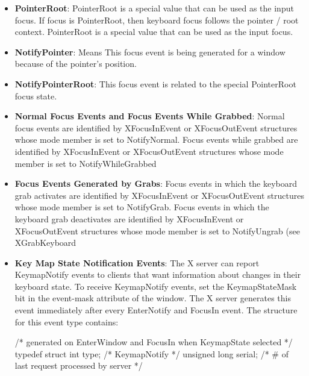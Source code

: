 \documentclass{report}
\begin{document}
\begin{itemize}
            \bigbreak \noindent 
            Depending on the event mode, the detail member is set to indicate the notify detail and can be NotifyAncestor, NotifyVirtual, NotifyInferior, NotifyNonlinear, NotifyNonlinearVirtual, NotifyPointer, NotifyPointerRoot, or NotifyDetailNone.
        \item \textbf{PointerRoot}: PointerRoot is a special value that can be used as the input focus.
            \bigbreak \noindent 
            If focus is PointerRoot, then keyboard focus follows the pointer / root context. PointerRoot is a special value that can be used as the input focus.
        \item \textbf{NotifyPointer}: Means This focus event is being generated for a window because of the pointer’s position.
        \item \textbf{NotifyPointerRoot}: This focus event is related to the special PointerRoot focus state.
        \item \textbf{Normal Focus Events and Focus Events While Grabbed}: Normal focus events are identified by XFocusInEvent or XFocusOutEvent structures whose mode member is set to NotifyNormal. Focus events while grabbed are identified by XFocusInEvent or XFocusOutEvent structures whose mode member is set to NotifyWhileGrabbed
        \item \textbf{Focus Events Generated by Grabs}: Focus events in which the keyboard grab activates are identified by XFocusInEvent or XFocusOutEvent structures whose mode member is set to NotifyGrab. Focus events in which the keyboard grab deactivates are identified by XFocusInEvent or XFocusOutEvent structures whose mode member is set to NotifyUngrab (see XGrabKeyboard
        \item \textbf{Key Map State Notification Events}: The X server can report KeymapNotify events to clients that want information about changes in their keyboard state.
            \bigbreak \noindent 
            To receive KeymapNotify events, set the KeymapStateMask bit in the event-mask attribute of the window. The X server generates this event immediately after every EnterNotify and FocusIn event.
            \bigbreak \noindent 
            The structure for this event type contains:
            \bigbreak \noindent 
            \begin{cppcode}
                /* generated on EnterWindow and FocusIn when KeymapState selected */
                typedef struct {
                    int type;                   /* KeymapNotify */
                    unsigned long serial;       /* # of last request processed by server */
}
\end{cppcode}
\end{itemize}
\end{document}
